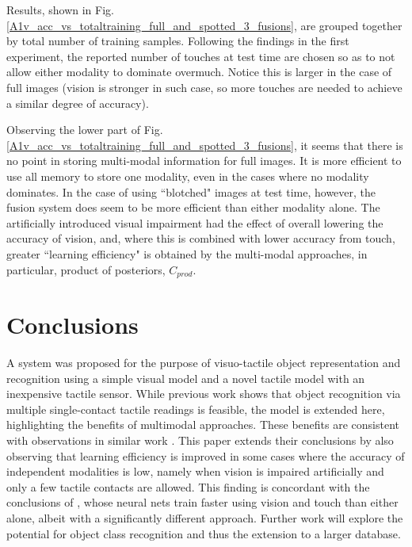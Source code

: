 \documentclass[letterpaper, 10 pt, conference]{ieeeconf}  %
\begin{document}
Results, shown in Fig. \ref{A1v_acc_vs_totaltraining_full_and_spotted_3_fusions}, are grouped together by total number of training samples. Following the findings in the first experiment, the reported number of touches at test time are chosen so as to not allow either modality to dominate overmuch. Notice this is larger in the case of full images (vision is stronger in such case, so more touches are needed to achieve a similar degree of accuracy).

Observing the lower part of Fig. \ref{A1v_acc_vs_totaltraining_full_and_spotted_3_fusions}, it seems that there is no point in storing multi-modal information for full images. It is more efficient to use all memory to store one modality, even in the cases where no modality dominates. In the case of using ``blotched" images at test time, however, the fusion system does seem to be more efficient than either modality alone. The artificially introduced visual impairment had the effect of overall lowering the accuracy of vision, and, where this is combined with lower accuracy from touch, greater ``learning efficiency" is obtained by the multi-modal approaches, in particular, product of posteriors, $C_{prod}$.
\begin{figure}
	\centering
	\end{figure}
	
\section{Conclusions}
A system was proposed for the purpose of visuo-tactile object representation and recognition using a simple visual model and a novel tactile model with an inexpensive tactile sensor. While previous work \cite{Corradi2015} shows that object recognition via multiple single-contact tactile readings is feasible, the model is extended here, highlighting the benefits of multimodal approaches. These benefits are consistent with observations in similar work \cite{Yang2015}. This paper extends their conclusions by also observing that learning efficiency is improved in some cases where the accuracy of independent modalities is low, namely when vision is impaired artificially and only a few tactile contacts are allowed. This finding is concordant with the conclusions of \cite{Kim2004}, whose neural nets train faster using vision and touch than either alone, albeit with a significantly different approach. Further work will explore the potential for object class recognition and thus the extension to a larger database.
	


\end{document}
